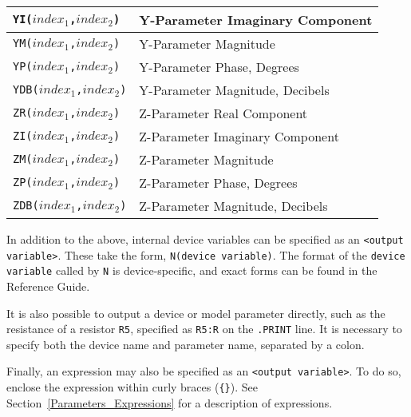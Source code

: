 \begin{table}[!htb]
\begin{tabularx}{\linewidth}{|Y|Y|}
    \texttt{YI($index_1$,$index_2$)} & Y-Parameter Imaginary Component \\ \hline
    \texttt{YM($index_1$,$index_2$)} & Y-Parameter Magnitude \\ \hline
    \texttt{YP($index_1$,$index_2$)} & Y-Parameter Phase, Degrees \\ \hline
    \texttt{YDB($index_1$,$index_2$)} & Y-Parameter Magnitude, Decibels \\ \hline
    \texttt{ZR($index_1$,$index_2$)} & Z-Parameter Real Component \\ \hline
    \texttt{ZI($index_1$,$index_2$)} & Z-Parameter Imaginary Component \\ \hline
    \texttt{ZM($index_1$,$index_2$)} & Z-Parameter Magnitude \\ \hline
    \texttt{ZP($index_1$,$index_2$)} & Z-Parameter Phase, Degrees \\ \hline
    \texttt{ZDB($index_1$,$index_2$)} & Z-Parameter Magnitude, Decibels
  \end{tabularx}
\end{table}

In addition to the above, internal device variables can be specified as an
\texttt{<output variable>}.  These take the form, \texttt{N(device variable)}.
The format of the \texttt{device variable} called by \texttt{N} is
device-specific, and exact forms can be found in the \Xyce{} Reference
Guide\ReferenceGuide{}.

It is also possible to output a device or model parameter directly, such as 
the resistance of a resistor \texttt{R5}, specified as \texttt{R5:R} on the \texttt{.PRINT} line.
It is necessary to specify both the device name and parameter name,
separated by a colon.

Finally, an expression may also be specified as an \texttt{<output
variable>}. To do so, enclose the expression within curly braces
(\texttt{\{\}}).  See Section~\ref{Parameters_Expressions} for a description of
expressions.


